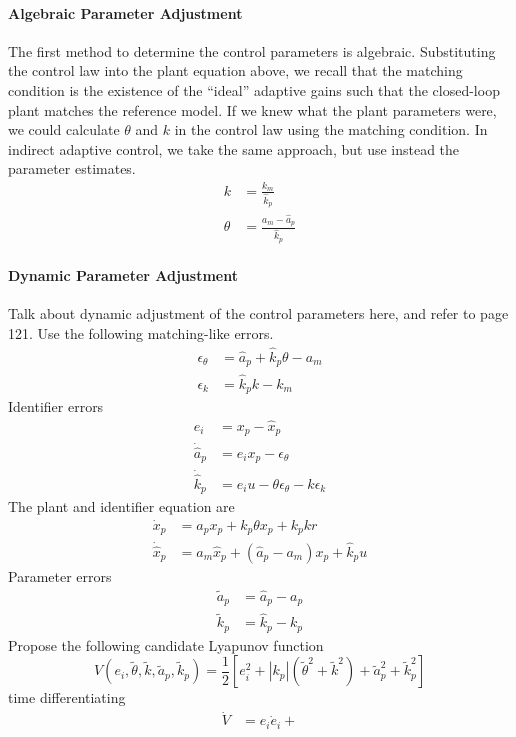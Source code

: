 \paragraph{Algebraic Parameter Adjustment}
The first method to determine the control parameters is algebraic.
Substituting the control law into the plant equation above, we recall that the matching condition is the existence of the ``ideal'' adaptive gains such that the closed-loop plant matches the reference model.
If we knew what the plant parameters were, we could calculate $\theta$ and $k$ in the control law using the matching condition.
In indirect adaptive control, we take the same approach, but use instead the parameter estimates.
\begin{align*}
  k&=\frac{k_{m}}{\hat{k}_{p}} \\
  \theta&=\frac{a_{m}-\hat{a}_{p}}{\hat{k}_{p}}
\end{align*}

\paragraph{Dynamic Parameter Adjustment}
Talk about dynamic adjustment of the control parameters here, and refer to page 121.
Use the following matching-like errors.
\begin{align*}
  \epsilon_{\theta}&=\hat{a}_{p}+\hat{k}_{p}\theta-a_{m} \\
  \epsilon_{k}&=\hat{k}_{p}k-k_{m}
\end{align*}
Identifier errors
\begin{align*}
  e_{i}&=x_{p}-\hat{x}_{p} \\
  \dot{\hat{a}}_{p}&=e_{i}x_{p}-\epsilon_{\theta} \\
  \dot{\hat{k}}_{p}&=e_{i}u-\theta\epsilon_{\theta}-k\epsilon_{k}
\end{align*}
The plant and identifier equation are
\begin{align*}
  \dot{x}_{p}&=a_{p}x_{p}+k_{p}\theta x_{p}+k_{p}kr \\
  \dot{\hat{x}}_{p}&=a_{m}\hat{x}_{p}+(\hat{a}_{p}-a_{m})x_{p}+\hat{k}_{p}u
\end{align*}
Parameter errors
\begin{align*}
  \tilde{a}_{p}&=\hat{a}_{p}-a_{p} \\
  \tilde{k}_{p}&=\hat{k}_{p}-k_{p}
\end{align*}
Propose the following candidate Lyapunov function
\begin{equation*}
  V(e_{i},\tilde{\theta},\tilde{k},\tilde{a}_{p},\tilde{k}_{p})=\frac{1}{2}\left[e_{i}^{2}+|k_{p}|(\tilde{\theta}^{2}+\tilde{k}^{2})+\tilde{a}_{p}^{2}+\tilde{k}_{p}^{2}\right]
\end{equation*}
time differentiating
\begin{align*}
  \dot{V}&=e_{i}\dot{e}_{i}+
\end{align*}

